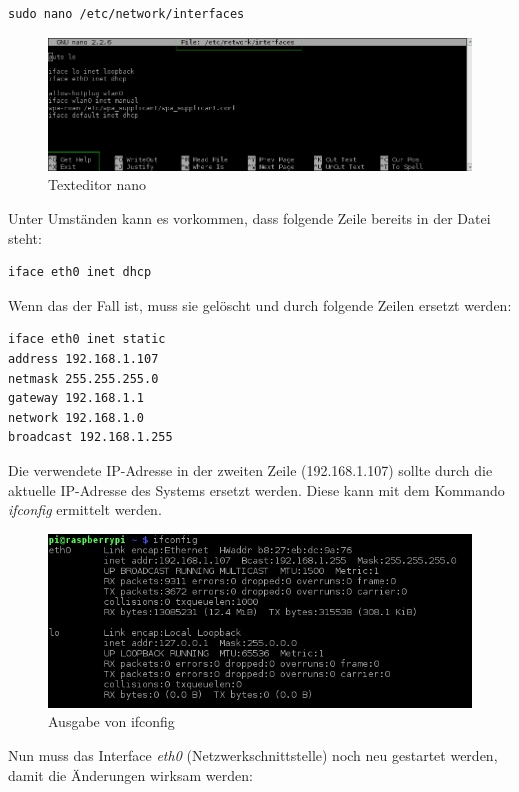 \begin{lstlisting}
sudo nano /etc/network/interfaces
\end{lstlisting} 

\begin{figure}[H]
\centering
\includegraphics[scale=0.6]{images/nano}
\caption{Texteditor nano}
\end{figure}

Unter Umständen kann es vorkommen, dass folgende Zeile bereits in der Datei steht:

\begin{lstlisting}
iface eth0 inet dhcp
\end{lstlisting}

Wenn das der Fall ist, muss sie gelöscht und durch folgende Zeilen ersetzt werden:

\begin{lstlisting}
iface eth0 inet static
address 192.168.1.107
netmask 255.255.255.0
gateway 192.168.1.1
network 192.168.1.0
broadcast 192.168.1.255
\end{lstlisting}

Die verwendete IP-Adresse in der zweiten Zeile (192.168.1.107) sollte durch die aktuelle IP-Adresse des Systems ersetzt werden. Diese kann mit dem Kommando \textit{ifconfig} ermittelt werden.

\begin{figure}[H]
\centering
\includegraphics[scale=0.65]{images/ifconfig}
\caption{Ausgabe von ifconfig}
\end{figure}

Nun muss das Interface \textit{eth0} (Netzwerkschnittstelle) noch neu gestartet werden, damit die Änderungen wirksam werden:

